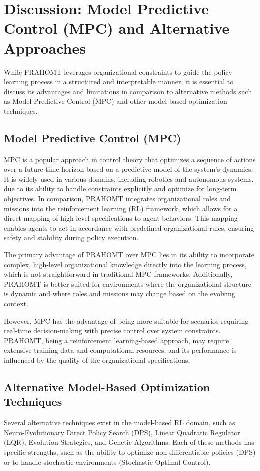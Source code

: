 \documentclass[sigconf,anonymous]{aamas}
\begin{document}
\section{Discussion: Model Predictive Control (MPC) and Alternative Approaches}

While PRAHOMT leverages organizational constraints to guide the policy learning process in a structured and interpretable manner, it is essential to discuss its advantages and limitations in comparison to alternative methods such as Model Predictive Control (MPC) and other model-based optimization techniques.

\subsection{Model Predictive Control (MPC)}
MPC is a popular approach in control theory that optimizes a sequence of actions over a future time horizon based on a predictive model of the system's dynamics. It is widely used in various domains, including robotics and autonomous systems, due to its ability to handle constraints explicitly and optimize for long-term objectives. In comparison, PRAHOMT integrates organizational roles and missions into the reinforcement learning (RL) framework, which allows for a direct mapping of high-level specifications to agent behaviors. This mapping enables agents to act in accordance with predefined organizational rules, ensuring safety and stability during policy execution.

The primary advantage of PRAHOMT over MPC lies in its ability to incorporate complex, high-level organizational knowledge directly into the learning process, which is not straightforward in traditional MPC frameworks. Additionally, PRAHOMT is better suited for environments where the organizational structure is dynamic and where roles and missions may change based on the evolving context.

However, MPC has the advantage of being more suitable for scenarios requiring real-time decision-making with precise control over system constraints. PRAHOMT, being a reinforcement learning-based approach, may require extensive training data and computational resources, and its performance is influenced by the quality of the organizational specifications.

\subsection{Alternative Model-Based Optimization Techniques}
Several alternative techniques exist in the model-based RL domain, such as Neuro-Evolutionary Direct Policy Search (DPS), Linear Quadratic Regulator (LQR), Evolution Strategies, and Genetic Algorithms. Each of these methods has specific strengths, such as the ability to optimize non-differentiable policies (DPS) or to handle stochastic environments (Stochastic Optimal Control).
\end{document}
